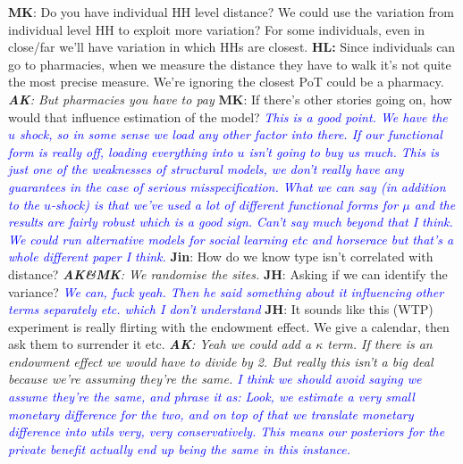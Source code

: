 \documentclass{article}
\begin{document}
\newline
\newline
\textbf{MK}: Do you have individual HH level distance? We could use the variation 
from individual level HH to exploit more variation? For some individuals, 
even in close/far we'll have variation in which HHs are closest.
\newline
\newline
\textbf{HL:} Since individuals can go to pharmacies, when we measure the distance 
they have to walk it's not quite the most precise measure. We're ignoring the closest 
PoT could be a pharmacy.
\emph{\textbf{AK}: But pharmacies you have to pay}
\newline
\newline
\textbf{MK}: If there's other stories going on, how would that influence 
estimation of the model?
\emph{\textcolor{blue}{This is a good point. We have the $u$ shock, so in some sense we load any 
other factor into there. If our functional form is really off, loading everything into 
$u$ isn't going to buy us much. This is just one of the weaknesses of structural 
models, we don't really have any guarantees in the case of serious misspecification. 
What we can say (in addition to the $u$-shock) is that we've used a lot of different 
functional forms for $\mu$ and the results are fairly robust which is a good sign. Can't 
say much beyond that I think. We could run alternative models for social learning etc and 
horserace but that's a whole different paper I think.}}
\newline
\newline
\textbf{Jin}: How do we know type isn't correlated with distance? 
\emph{\textbf{AK\&MK}: We randomise the sites.}
\newline
\newline
\textbf{JH}: Asking if we can identify the variance?
\emph{\textcolor{blue}{We can, fuck yeah. Then he said something about it influencing 
other terms separately etc. which I don't understand}}
\newline
\newline
\textbf{JH}: It sounds like this (WTP) experiment is really flirting with the endowment 
effect. We give a calendar, then ask them to surrender it etc.
\emph{
    \textbf{AK}: Yeah we could add a $\kappa$ term. If there is an endowment effect 
    we would have to divide by 2. But really this isn't a big deal because we're 
    assuming they're the same.
    \textcolor{blue}{I think we should avoid saying we assume they're the same, and phrase it as:
    Look, we estimate a very small monetary difference for the two, and on top of that 
    we translate monetary difference into utils very, very conservatively. This means 
    our posteriors for the private benefit actually end up being the same in this instance. 
    }
}
\end{document}

